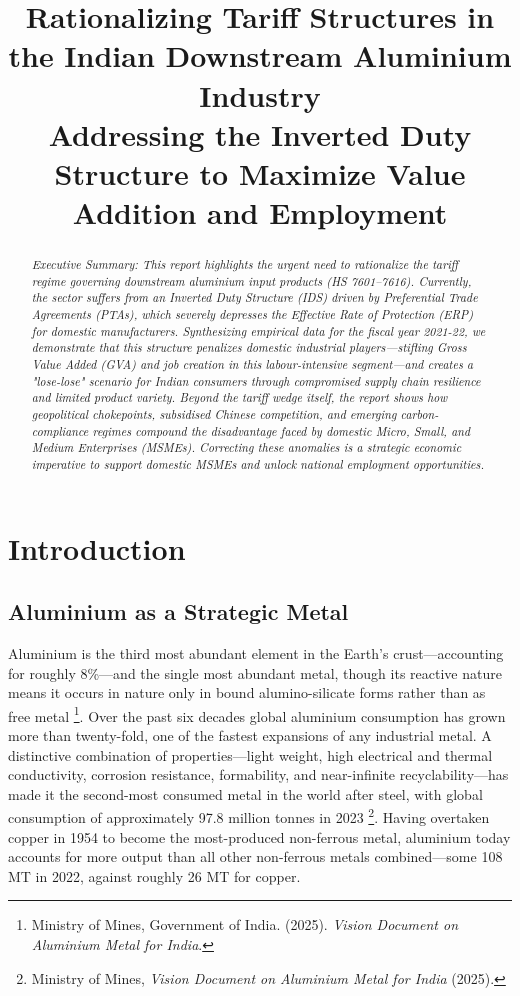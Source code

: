 \documentclass[11pt, a4paper]{article}
\title{\textbf{Rationalizing Tariff Structures in the Indian Downstream Aluminium Industry}\\
\Large Addressing the Inverted Duty Structure to Maximize Value Addition and Employment}
\author{}
\date{}
\numberwithin{figure}{section}
\numberwithin{table}{section}
\begin{document}
\maketitle

\begin{abstract}
    \noindent \textit{Executive Summary: This report highlights the urgent need to rationalize the tariff regime governing downstream aluminium input products (HS 7601--7616). Currently, the sector suffers from an Inverted Duty Structure (IDS) driven by Preferential Trade Agreements (PTAs), which severely depresses the Effective Rate of Protection (ERP) for domestic manufacturers. Synthesizing empirical data for the fiscal year 2021-22, we demonstrate that this structure penalizes domestic industrial players—stifling Gross Value Added (GVA) and job creation in this labour-intensive segment—and creates a "lose-lose" scenario for Indian consumers through compromised supply chain resilience and limited product variety. Beyond the tariff wedge itself, the report shows how geopolitical chokepoints, subsidised Chinese competition, and emerging carbon-compliance regimes compound the disadvantage faced by domestic Micro, Small, and Medium Enterprises (MSMEs). Correcting these anomalies is a strategic economic imperative to support domestic MSMEs and unlock national employment opportunities.}
\end{abstract}

\vspace{1cm}
\tableofcontents
\newpage

\section{Introduction}

\subsection{Aluminium as a Strategic Metal}
Aluminium is the third most abundant element in the Earth's crust---accounting for roughly 8\%---and the single most abundant metal, though its reactive nature means it occurs in nature only in bound alumino-silicate forms rather than as free metal \cite{mom_vision2025}\footnote{Ministry of Mines, Government of India. (2025). \textit{Vision Document on Aluminium Metal for India}.}. Over the past six decades global aluminium consumption has grown more than twenty-fold, one of the fastest expansions of any industrial metal. A distinctive combination of properties---light weight, high electrical and thermal conductivity, corrosion resistance, formability, and near-infinite recyclability---has made it the second-most consumed metal in the world after steel, with global consumption of approximately 97.8 million tonnes in 2023 \cite{mom_vision2025}\footnote{Ministry of Mines, \textit{Vision Document on Aluminium Metal for India} (2025).}. Having overtaken copper in 1954 to become the most-produced non-ferrous metal, aluminium today accounts for more output than all other non-ferrous metals combined---some 108 MT in 2022, against roughly 26 MT for copper.
\end{document}
